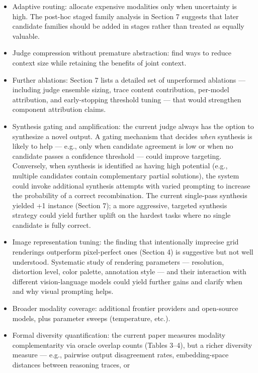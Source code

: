 \documentclass[11pt]{article}
\providecommand{\tightlist}{%
  \setlength{\itemsep}{0pt}\setlength{\parskip}{0pt}}
\begin{document}
\begin{itemize}
\tightlist
\item
  Adaptive routing: allocate expensive modalities only when uncertainty
  is high. The post-hoc staged family analysis in Section 7 suggests
  that later candidate families should be added in stages rather than
  treated as equally valuable.
\item
  Judge compression without premature abstraction: find ways to reduce
  context size while retaining the benefits of joint context.
\item
  Further ablations: Section 7 lists a detailed set of unperformed
  ablations --- including judge ensemble sizing, trace content
  contribution, per-model attribution, and early-stopping threshold
  tuning --- that would strengthen component attribution claims.
\item
  Synthesis gating and amplification: the current judge always has the
  option to synthesize a novel output. A gating mechanism that decides
  \emph{when} synthesis is likely to help --- e.g., only when candidate
  agreement is low or when no candidate passes a confidence threshold
  --- could improve targeting. Conversely, when synthesis is identified
  as having high potential (e.g., multiple candidates contain
  complementary partial solutions), the system could invoke additional
  synthesis attempts with varied prompting to increase the probability
  of a correct recombination. The current single-pass synthesis yielded
  +1 instance (Section 7); a more aggressive, targeted synthesis
  strategy could yield further uplift on the hardest tasks where no
  single candidate is fully correct.
\item
  Image representation tuning: the finding that intentionally imprecise
  grid renderings outperform pixel-perfect ones (Section 4) is
  suggestive but not well understood. Systematic study of rendering
  parameters --- resolution, distortion level, color palette, annotation
  style --- and their interaction with different vision-language models
  could yield further gains and clarify when and why visual prompting
  helps.
\item
  Broader modality coverage: additional frontier providers and
  open-source models, plus parameter sweeps (temperature, etc.).
\item
  Formal diversity quantification: the current paper measures modality
  complementarity via oracle overlap counts (Tables 3--4), but a richer
  diversity measure --- e.g., pairwise output disagreement rates,
  embedding-space distances between reasoning traces, or

\end{itemize}
\end{document}

